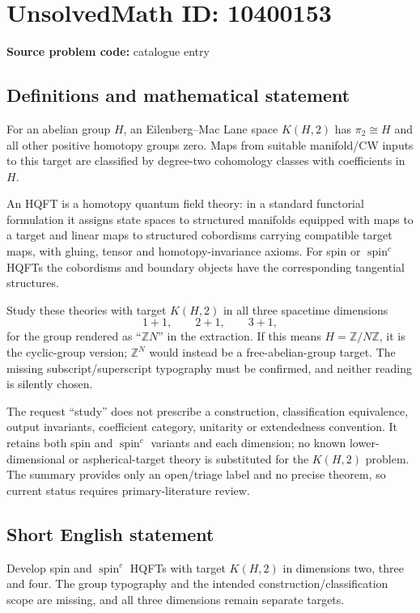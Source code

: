 \documentclass[11pt]{article}
\begin{document}
\section*{UnsolvedMath ID: 10400153}
\textbf{Source problem code:} catalogue entry
\subsection{Definitions and mathematical statement}
For an abelian group \(H\), an Eilenberg--Mac Lane space \(K(H,2)\) has \(\pi_2\cong H\) and all other positive homotopy groups zero. Maps from suitable manifold/CW inputs to this target are classified by degree-two cohomology classes with coefficients in \(H\).

An HQFT is a homotopy quantum field theory: in a standard functorial formulation it assigns state spaces to structured manifolds equipped with maps to a target and linear maps to structured cobordisms carrying compatible target maps, with gluing, tensor and homotopy-invariance axioms. For spin or \(\operatorname{spin}^c\) HQFTs the cobordisms and boundary objects have the corresponding tangential structures.

Study these theories with target \(K(H,2)\) in all three spacetime dimensions
\[
 1+1,\qquad2+1,\qquad3+1,
\]
for the group rendered as ``\(\mathbb Z N\)'' in the extraction. If this means \(H=\mathbb Z/N\mathbb Z\), it is the cyclic-group version; \(\mathbb Z^N\) would instead be a free-abelian-group target. The missing subscript/superscript typography must be confirmed, and neither reading is silently chosen.

The request ``study'' does not prescribe a construction, classification equivalence, output invariants, coefficient category, unitarity or extendedness convention. It retains both spin and \(\operatorname{spin}^c\) variants and each dimension; no known lower-dimensional or aspherical-target theory is substituted for the \(K(H,2)\) problem. The summary provides only an open/triage label and no precise theorem, so current status requires primary-literature review.
\subsection{Short English statement}
Develop spin and \(\operatorname{spin}^c\) HQFTs with target \(K(H,2)\) in dimensions two, three and four. The group typography and the intended construction/classification scope are missing, and all three dimensions remain separate targets.
\end{document}
